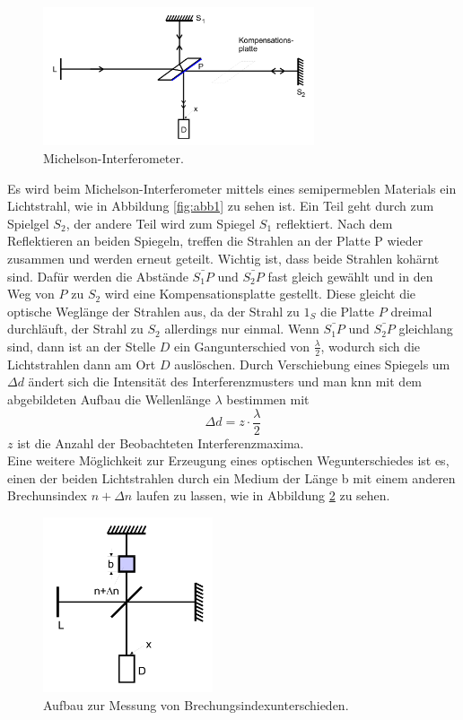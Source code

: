 \begin{figure}
    \centering
    \includegraphics[width=8cm]{data/abb2.png}
    \caption{Michelson-Interferometer.}
    \label{fig:abb2}
\end{figure}
\FloatBarrier
Es wird beim Michelson-Interferometer mittels eines semipermeblen Materials ein Lichtstrahl, wie in Abbildung \ref{fig:abb1} zu sehen ist.
Ein Teil geht durch zum Spielgel $S_2$, der andere Teil wird zum Spiegel $S_1$ reflektiert.
Nach dem Reflektieren an beiden Spiegeln, treffen die Strahlen an der Platte P wieder zusammen und werden erneut geteilt.
Wichtig ist, dass beide Strahlen kohärnt sind.
Dafür werden die Abstände $\bar{S_1P} \text{ und } \bar{S_2P}$ fast gleich gewählt und in den Weg von $P$ zu $S_2$ wird eine Kompensationsplatte gestellt.
Diese gleicht die optische Weglänge der Strahlen aus, da der Strahl zu $1_S$ die Platte $P$ dreimal durchläuft, der Strahl zu $S_2$ allerdings nur einmal.
Wenn $\bar{S_1P} \text{ und } \bar{S_2P}$ gleichlang sind, dann ist an der Stelle $D$ ein Gangunterschied von $\frac{\lambda}{2}$, wodurch sich die Lichtstrahlen dann am Ort $D$ auslöschen.
Durch Verschiebung eines Spiegels um $\Delta d$ ändert sich die Intensität des Interferenzmusters und man knn mit dem abgebildeten Aufbau die Wellenlänge $\lambda$ bestimmen mit
\begin{equation}
    \Delta d = z \cdot \frac{\lambda}{2}
\end{equation}
$z$ ist die Anzahl der Beobachteten Interferenzmaxima. \\
Eine weitere Möglichkeit zur Erzeugung eines optischen Wegunterschiedes ist es,
einen der beiden Lichtstrahlen durch ein Medium der Länge b mit einem anderen Brechunsindex $n + \Delta n$ laufen zu lassen, wie in Abbildung \ref{fig:abb3} zu sehen.
\begin{figure}
    \centering
    \includegraphics[width=5cm]{data/abb3.png}
    \caption{Aufbau zur Messung von Brechungsindexunterschieden.}
    \label{fig:abb3}
\end{figure}
